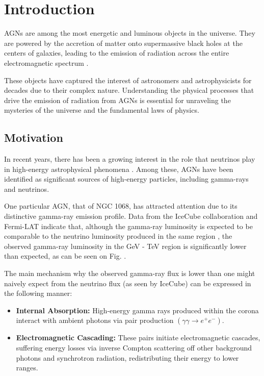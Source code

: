 \chapter{Introduction}
\label{chap:Introduction}

AGNs are among the most energetic and luminous objects in the universe. They are powered by the accretion of matter onto supermassive black holes at the centers of galaxies, leading to the emission of radiation across the entire electromagnetic spectrum \citep{RadiativeProcesses}.

These objects have captured the interest of astronomers and astrophysicists for decades due to their complex nature. Understanding the physical processes that drive the emission of radiation from AGNs is essential for unraveling the mysteries of the universe and the fundamental laws of physics.

\section{Motivation}

In recent years, there has been a growing interest in the role that neutrinos play in high-energy astrophysical phenomena \citep{Eichmann_2022}. Among these, AGNs have been identified as significant sources of high-energy particles, including gamma-rays and neutrinos. 

One particular AGN, that of NGC 1068, has attracted attention due to its distinctive gamma-ray emission profile. Data from the IceCube collaboration \citep{IceCube2022} and Fermi-LAT \citep{Fermi12yeardata} indicate that, although the gamma-ray luminosity is expected to be comparable to the neutrino luminosity produced in the same region \citep{GammaRayModel2023}, the observed gamma-ray luminosity in the GeV - TeV region is significantly lower than expected, as can be seen on Fig. .

The main mechanism why the observed gamma-ray flux is lower than one might naively expect from the neutrino flux (as seen by IceCube) can be expressed in the following manner:

\begin{itemize}
    \item \textbf{Internal Absorption:} High-energy gamma rays produced within the corona interact with ambient photons via pair production $(\gamma\gamma \rightarrow e^+e^-)$.
    \item \textbf{Electromagnetic Cascading:} These pairs initiate electromagnetic cascades, suffering energy losses via inverse Compton scattering off other background photons and synchrotron radiation, redistributing their energy to lower ranges.
\end{itemize}

